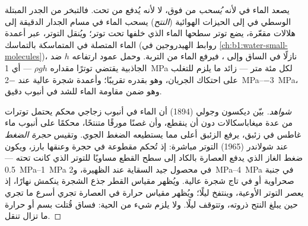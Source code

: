 \begin{theorem}\label{thm:b1:plant-transport:cohesiontension}
يصعد الماء في  لأنه \emph{يُسحب} من فوق، لا لأنه يُدفع من
تحت. فالتبخر من الجدر المبتلة   الوسطي في  إلى
الحيزات الهوائية (\emph{النتح}) يسحب الماء في مسام الجدار الدقيقة
إلى هلالات مقعّرة، يضع توتر سطحها الماء الذي خلفها تحت توتر؛
ويُنقل التوتر، عبر أعمدة الماء المتصلة في  المتماسكة بالتماسك
(روابط الهيدروجين في
\cref{ch:b1:water-small-molecules})، نازلًا في الساق وإلى ،
فيرفع الماء من التربة. وحمل عمود ارتفاعه $h$ ضد الجاذبية يقتضي
توترًا مقداره $\rho g h$ --- أي \qty{1}{MPa} لكل مئة متر --- زائد ما
يلزم للتغلب على احتكاك الجريان، وهو بقدره تقريبًا؛ وأعمدة شجرة
عالية عند \qtyrange{-2}{-3}{MPa}، وهو ضمن مقاومة الماء للشد في
أنبوب دقيق.
\end{theorem}
\begin{proof}[شواهد]
بيّن ديكسون وجولي (1894) أن الماء في أنبوب زجاجي محكم يحتمل توترات
من عدة ميغاباسكالات دون أن ينقطع، وأن غصنًا مورقًا متنتحًا، محكمًا
على أنبوب ماء غاطس في زئبق، يرفع الزئبق أعلى مما يستطيعه الضغط
الجوي. وتقيس \emph{حجرة الضغط} عند شولاندر (1965) التوتر مباشرة:
إذ تُحكم  مقطوعة في حجرة وعنقها بارز، ويكون ضغط الغاز الذي يدفع
العصارة بالكاد إلى سطح القطع مساويًا للتوتر الذي كانت تحته ---
\qtyrange{0.5}{1}{MPa} في محصول جيد السقاية عند الظهيرة،
و\qtyrange{2}{4}{MPa} في جنبة صحراوية أو في تاج شجرة عالية. ويُظهر
مقياس القطر جذع الشجرة ينكمش نهارًا، إذ يعصر التوتر الأوعية،
وينتفخ ليلًا؛ ويُظهر مقياس حرارة في  العصارة تجري أسرع ما
تجري حين يبلغ النتح ذروته، وتتوقف ليلًا. ولا يلزم شيء من 
الحية: فساق قُتلت بسم أو حرارة ما تزال تنقل.
\end{proof}

